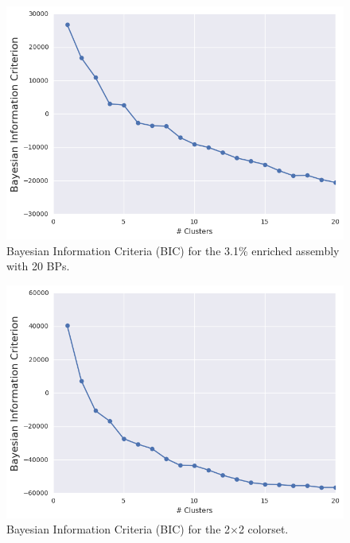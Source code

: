 \begin{figure}[h!]
\centering
\includegraphics[width=0.87\linewidth]{figures/results/model-select/assm-31-20BPs/bic-combined-U238-capture-1}
\vspace{2mm}
\caption[Silhouette coefficients for the 3.1\% enriched assembly with 20 BPs]{Bayesian Information Criteria (BIC) for the 3.1\% enriched assembly with 20 \acp{BP}.}
\label{fig:chap11-assm-31-20BPs-bic}
\end{figure}

\clearpage

\begin{figure}[h!]
\centering
\includegraphics[width=0.87\linewidth]{figures/results/model-select/2x2/bic-combined-U238-capture-1}
\vspace{2mm}
\caption[BIC for the 2$\times$2 colorset]{Bayesian Information Criteria (BIC) for the 2$\times$2 colorset.}
\label{fig:chap11-2x2-bic}
\end{figure}

